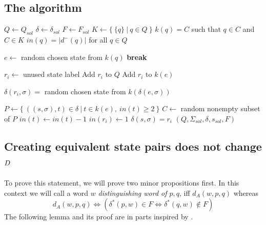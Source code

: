 \subsection{The algorithm}

\vspace{0.2cm}
\begin{spacing}{1}
\begin{algorithmic}[1]
    \State $Q \gets Q_{sol}$
    \State $\delta \gets \delta_{sol}$
    \State $F \gets F_{sol}$
	\State $K \gets \{\ \{q\}\ |\ q \in Q\ \}$ 
	\State $k(q) = C$ such that $q \in C$ and $C \in K$ 
	\State $in(q) = |d^-(q)|$ for all $q \in Q$ 
	
		 
				\State $e \gets$ random chosen state from $k(q)$
				\State \textbf{break}
			\EndIf
		\EndFor
		
		\State $r_i \gets$ unused state label 
        \State Add $r_i$ to $Q$
		\State Add $r_i$ to $k(e)$
		
		 
			\State $\delta(r_i, \sigma) =$ random chosen state from $k(\delta(e, \sigma))$
		\EndFor
		
		\State $P \gets \{\ ((s, \sigma), t) \in \delta\ |\ t \in k(e),\ in(t) \geq 2\ \}$ 
		\State $C \gets$ random nonempty subset of $P$
			\State $in(t) \gets in(t) - 1$
			\State $in(r_i) \gets 1$
            \State $\delta(s, \sigma) = r_i$
		\EndFor
	\EndFor
    \State \Return $(Q, \Sigma_{sol}, \delta, s_{sol}, F)$
	\EndFunction
\end{algorithmic}
\end{spacing}
\vspace{0.2cm}

\subsection{Creating equivalent state pairs does not change $D$} \label{ch:3:sec-D-proof}

To prove this statement, we will prove two minor propositions first. In this context we will call a word $w$ \emph{distinguishing word of $p,q$}, iff $d_A(w, p, q)$ whereas
\[
    d_A(w, p, q) \Leftrightarrow (\delta^*(p,w) \in F \Leftrightarrow \delta^*(q,w) \notin F)
\]
The following lemma and its proof are in parts inspired by \cite[ch.\ 4 p.\ 18]{MS18}.

